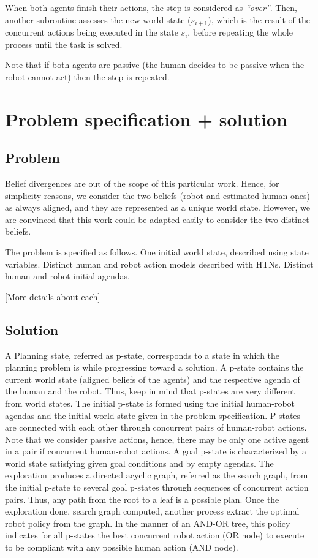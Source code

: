 When both agents finish their actions, the step is considered as \textit{``over''}. 
Then, another subroutine assesses the new world state ($s_{i+1}$), which is the result of the concurrent actions being executed in the state $s_i$, before repeating the whole process until the task is solved.

Note that if both agents are passive (the human decides to be passive when the robot cannot act) then the step is repeated. 

\section{Problem specification + solution}

    \subsection{Problem}

Belief divergences are out of the scope of this particular work. Hence, for simplicity reasons, we consider the two beliefs (robot and estimated human ones) as always aligned, and they are represented as a unique world state. However, we are convinced that this work could be adapted easily to consider the two distinct beliefs.

The problem is specified as follows. One initial world state, described using state variables. Distinct human and robot action models described with HTNs. Distinct human and robot initial agendas. 

[More details about each]

    \subsection{Solution}

A Planning state, referred as p-state, corresponds to a state in which the planning problem is while progressing toward a solution. A p-state contains the current world state (aligned beliefs of the agents) and the respective agenda of the human and the robot. Thus, keep in mind that p-states are very different from world states.
The initial p-state is formed using the initial human-robot agendas and the initial world state given in the problem specification. P-states are connected with each other through concurrent pairs of human-robot actions. Note that we consider passive actions, hence, there may be only one active agent in a pair if concurrent human-robot actions. A goal p-state is characterized by a world state satisfying given goal conditions and by empty agendas.
The exploration produces a directed acyclic graph, referred as the search graph, from the initial p-state to several goal p-states through sequences of concurrent action pairs. Thus, any path from the root to a leaf is a possible plan. Once the exploration done, search graph computed, another process extract the optimal robot policy from the graph. In the manner of an AND-OR tree, this policy indicates for all p-states the best concurrent robot action (OR node) to execute to be compliant with any possible human action (AND node).

